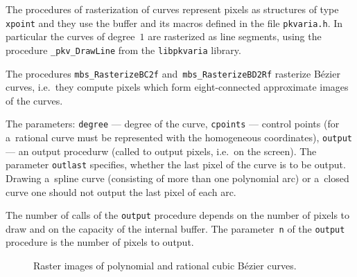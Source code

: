 The procedures of rasterization of curves represent pixels as
structures of type \texttt{xpoint} and they use the buffer and its macros
defined in the file \texttt{pkvaria.h}. In particular the curves of
degree~$1$ are rasterized as line segments, using the procedure
\texttt{\_pkv\_DrawLine} from the \texttt{libpkvaria} library.

\vspace{\bigskipamount}
The procedures \texttt{mbs\_RasterizeBC2f} and~\texttt{mbs\_RasterizeBD2Rf}
rasterize B\'{e}zier curves, i.e.\ they compute pixels which form
eight-connected approximate images of the curves.

The parameters: \texttt{degree} --- degree of the curve, \texttt{cpoints}
--- control points (for a~rational curve must be represented with the
homogeneous coordinates), \texttt{output} --- an output procedurw (called
to output pixels, i.e.\ on the screen). The parameter \texttt{outlast}
specifies, whether the last pixel of the curve is to be output.
Drawing a~spline curve (consisting of more than one polynomial arc)
or a~closed curve one should not output the last pixel of each arc.

The number of calls of the \texttt{output} procedure depends on the number
of pixels to draw and on the capacity of the internal buffer.
The parameter~\texttt{n} of the \texttt{output} procedure is the number of
pixels to output.

\begin{figure}[ht]
  \centerline{}
  \caption{Raster images of polynomial and rational cubic B\'{e}zier curves.}
\end{figure}

